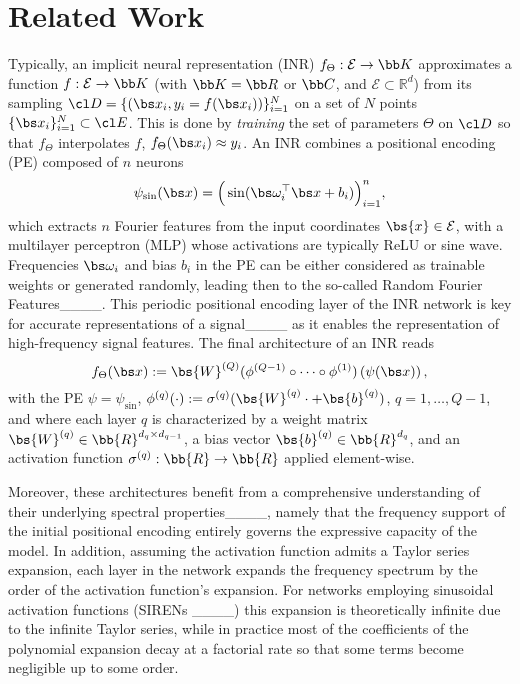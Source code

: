 \section{Related Work}
\label{sec:related_work}
Typically, an implicit neural representation (INR) $f_\Theta: \mathcal{E} \to \bb K$ approximates a function \( f : \mathcal{E} \to \bb K \) (with $\bb K = \bb R$ or $\bb C$, and \(\mathcal{E} \subset \mathbb{R}^d\)) from its sampling $\cl D = \{(\bs x_i, y_i = f(\bs x_i))\}_{i=1}^N$ on a set of $N$ points $\{\bs x_i\}_{i=1}^N \subset \cl E$. This is done by \emph{training} the set of parameters $\Theta$ on $\cl D$ so that $f_\Theta$ interpolates $f$, \ie $f_\Theta(\bs x_i) \approx y_i$. An INR combines a positional encoding (PE) composed of $n$ neurons
\begin{equation}
\label{eq:PE-Euclidean-INR}
\psi_{\sin}(\bs x) = \Big(\sin(\bs \omega_i^\top \bs x + b_i)\Big)_{i=1}^n,    
\end{equation}
which extracts $n$ Fourier features from the input coordinates \(\bs{x} \in \mathcal{E}\), with a multilayer perceptron (MLP) whose activations are typically ReLU or sine wave.  Frequencies $\bs \omega_i$ and bias $b_i$ in the PE can be either considered as trainable weights 
or generated randomly, leading then to the so-called Random Fourier Features____.
This periodic positional encoding layer of the INR network is key for accurate representations of a signal____ as it enables the representation of high-frequency signal features. 
The final architecture of an INR reads
\begin{equation}
\label{eq:INR}
f_{\Theta}(\bs x) := \bs{W}^{(Q)} (\phi^{(Q-1)}\circ \cdots \circ \phi^{(1)})\left(\psi(\bs x)\right),
\end{equation}
with the PE $\psi = \psi_{\sin}$, $\phi^{(q)}(\cdot) := \sigma^{(q)} (\bs{W}^{(q)} \cdot + \bs{b}^{(q)})$, $q=1,\ldots,Q-1$, and where each layer \( q \) is characterized by a weight matrix \( \bs{W}^{(q)} \in \bb{R}^{d_{q} \times d_{q-1}} \), a bias vector \( \bs{b}^{(q)} \in \bb{R}^{d_q} \), and an activation function \( \sigma^{(q)}: \bb{R} \rightarrow \bb{R} \) applied element-wise. 

Moreover, these architectures benefit from a comprehensive understanding of their underlying spectral properties____, namely that the frequency support of the initial positional encoding entirely governs the expressive capacity of the model. 
In addition, assuming the activation function admits a Taylor series expansion, 
each layer in the network expands the frequency spectrum by the order of the activation function’s expansion. For networks employing sinusoidal activation functions (\eg SIRENs ____) this expansion is theoretically infinite due to the infinite Taylor series, while in practice most of the coefficients of the polynomial expansion decay at a factorial rate so that some terms become negligible up to some order.   


